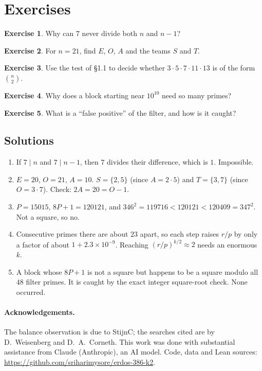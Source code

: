 \documentclass[11pt]{article}
\theoremstyle{definition}
\newtheorem{exercise}{Exercise}
\theoremstyle{remark}
\begin{document}
\section{Exercises}
\begin{exercise} Why can $7$ never divide both $n$ and $n-1$? \end{exercise}
\begin{exercise} For $n=21$, find $E$, $O$, $A$ and the teams $S$ and $T$. \end{exercise}
\begin{exercise} Use the test of \S1.1 to decide whether $3\cdot5\cdot7\cdot11\cdot13$ is of
the form $\binom{n}{2}$. \end{exercise}
\begin{exercise} Why does a block starting near $10^{10}$ need so many primes? \end{exercise}
\begin{exercise} What is a ``false positive'' of the filter, and how is it caught? \end{exercise}

\subsection*{Solutions}
\begin{enumerate}[label=\textbf{\arabic*.}]
\item If $7\mid n$ and $7\mid n-1$, then $7$ divides their difference, which is $1$. Impossible.
\item $E=20$, $O=21$, $A=10$. $S=\{2,5\}$ (since $A = 2\cdot5$) and $T=\{3,7\}$ (since
  $O = 3\cdot 7$). Check: $2A = 20 = O-1$.
\item $P = 15015$, $8P+1 = 120121$, and $346^2 = 119716 < 120121 < 120409 = 347^2$. Not a
  square, so no.
\item Consecutive primes there are about $23$ apart, so each step raises $r/p$ by only a
  factor of about $1 + 2.3\times10^{-9}$. Reaching $(r/p)^{k/2}\approx 2$ needs an enormous $k$.
\item A block whose $8P+1$ is not a square but happens to be a square modulo all $48$
  filter primes. It is caught by the exact integer square-root check. None occurred.
\end{enumerate}

\paragraph{Acknowledgements.} The balance observation is due to StijnC; the searches cited
are by D.~Weisenberg and D.~A.~Corneth. This work was done with substantial assistance from
Claude (Anthropic), an AI model. Code, data and Lean sources:
\url{https://github.com/sriharimysore/erdos-386-k2}.
\end{document}
